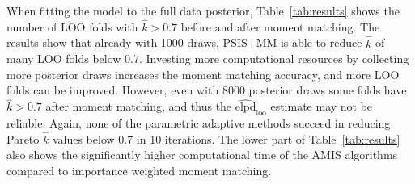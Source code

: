 \documentclass[12pt]{article}
\begin{document}
When fitting the model to the full data posterior,
Table~\ref{tab:results} shows the number of LOO folds with $\hat{k} > 0.7$
before and after moment matching.
The results show that already with 1000 draws,
PSIS+MM is able to reduce $\hat{k}$ of
many LOO folds below 0.7.
Investing more computational resources
by collecting more posterior draws increases
the moment matching accuracy, and more LOO folds can be improved.
However, even with $8000$ posterior draws some folds have $\hat{k} > 0.7$
after moment matching, and thus the $\widehat{\text{elpd}}_{\text{loo}}$
estimate may not be reliable.
%
%
%
%
Again, none of the parametric adaptive methods succeed in reducing Pareto $\hat{k}$ values
below 0.7 in 10 iterations. The lower part of Table~\ref{tab:results} also shows
the significantly higher computational time of the AMIS algorithms compared to importance
weighted moment matching.
\end{document}
